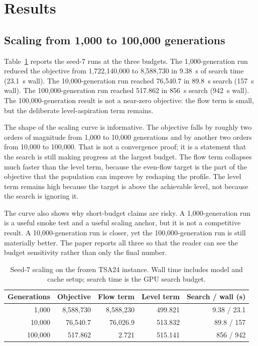 \documentclass[11pt]{article}
\begin{document}
\section{Results}\label{results}

\subsection{Scaling from 1,000 to 100,000 generations}

Table~\ref{tab:scaling} reports the seed-7 runs at the three budgets. The
1,000-generation run reduced the objective from 1,722,140,000 to
8,588,730 in 9.38~s of search time (23.1~s wall). The
10,000-generation run reached 76,540.7 in 89.8~s search (157~s wall).
The 100,000-generation run reached 517.862 in 856~s search
(942~s wall). The 100,000-generation result is not a near-zero objective: the
flow term is small, but the deliberate level-aspiration term remains.

The shape of the scaling curve is informative. The objective falls by roughly two orders of magnitude
from 1,000 to 10,000 generations and by another two orders from 10,000 to 100,000. That is not a
convergence proof; it is a statement that the search is still making progress at the largest budget.
The flow term collapses much faster than the level term, because the even-flow target is the part of
the objective that the population can improve by reshaping the profile. The level term remains high
because the target is above the achievable level, not because the search is ignoring it.

The curve also shows why short-budget claims are risky. A 1,000-generation run is a useful smoke test
and a useful scaling anchor, but it is not a competitive result. A 10,000-generation run is closer,
yet the 100,000-generation run is still materially better. The paper reports all three so that the
reader can see the budget sensitivity rather than only the final number.

\begin{table}[t]
\centering
\caption{Seed-7 scaling on the frozen TSA24 instance. Wall time includes model
and cache setup; search time is the GPU search budget.}
\label{tab:scaling}
\small
\begin{tabular}{rrrrr}
\toprule
Generations & Objective & Flow term & Level term & Search / wall (s) \\
\midrule
1,000 & 8,588,730 & 8,588,230 & 499.821 & 9.38 / 23.1 \\
10,000 & 76,540.7 & 76,026.9 & 513.832 & 89.8 / 157 \\
100,000 & 517.862 & 2.721 & 515.141 & 856 / 942 \\
\bottomrule
\end{tabular}
\end{table}
\end{document}
